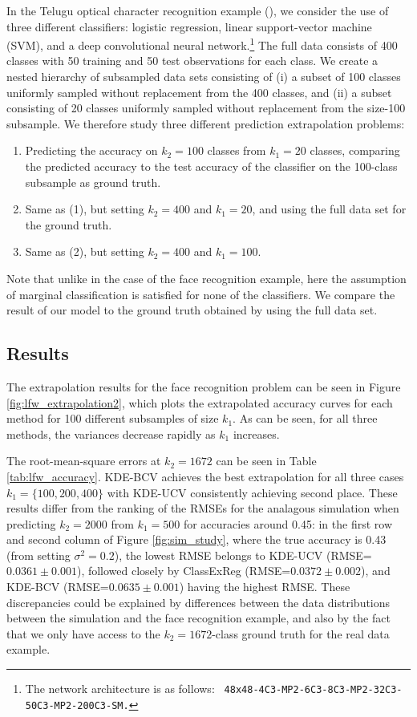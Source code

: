 \documentclass[twoside,11pt]{article}
\begin{document}
In the Telugu optical character recognition example
(\cite{achanta2015telugu}), we consider
the use of three different classifiers: logistic
regression, linear support-vector machine (SVM), and a
deep convolutional neural network.\footnote{The network architecture is
  as follows: {\tt
    48x48-4C3-MP2-6C3-8C3-MP2-32C3-50C3-MP2-200C3-SM.}} 
The full data consists of 400 classes with 50 training and 50 test observations for each class. We create a nested hierarchy of subsampled data sets consisting of (i) a subset of 100 classes uniformly sampled without replacement from the 400 classes, and (ii) a subset consisting of 20 classes uniformly sampled without replacement from the size-100 subsample.   We therefore study three different prediction extrapolation problems:
\begin{enumerate}
\item Predicting the accuracy on $k_2 = 100$ classes from $k_1 = 20$ classes, comparing the predicted accuracy to the test accuracy of the classifier on the 100-class subsample as ground truth.
\item Same as (1), but setting $k_2 = 400$ and $k_1 = 20$, and using the full data set for the ground truth.
\item Same as (2), but setting $k_2 = 400$ and $k_1 = 100$.
\end{enumerate}
Note that unlike in the case of the face recognition example,
here the assumption of marginal classification is satisfied for none of
the classifiers.  
We compare the result of our model to the ground
truth obtained by using the full data set.

\subsection{Results}

The extrapolation results for the face recognition problem can be seen in Figure
\ref{fig:lfw_extrapolation2}, which plots the extrapolated accuracy
curves for each method for 100 different subsamples of size $k_1$.  As
can be seen, for all three methods, the variances decrease rapidly as
$k_1$ increases. 

The root-mean-square errors at $k_2=1672$ can be seen in Table
\ref{tab:lfw_accuracy}.  KDE-BCV achieves the best extrapolation for
all three cases $k_1= \{100,200,400\}$ with KDE-UCV consistently
achieving second place.  These results differ from the ranking of the
RMSEs for the analagous simulation when predicting $k_2 = 2000$ from
$k_1 = 500$ for accuracies around 0.45: in the first row and second
column of Figure \ref{fig:sim_study}, where the true accuracy is 0.43
(from setting $\sigma^2=0.2$), the lowest RMSE belongs to KDE-UCV
(RMSE=$0.0361 \pm 0.001$), followed closely by ClassExReg (RMSE=$0.0372
\pm 0.002$), and KDE-BCV (RMSE=$0.0635\pm0.001$) having the highest
RMSE.  These discrepancies could be explained by differences between
the data distributions between the simulation and the face recognition
example, and also by the fact that we only have access to the $k_2 =
1672$-class ground truth for the real data example.
\end{document}
